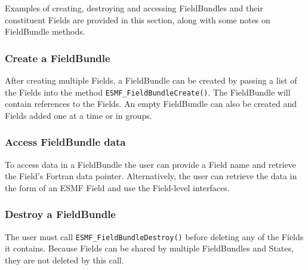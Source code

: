 

Examples of creating, destroying and accessing FieldBundles and their
constituent Fields are provided in this section, along with some
notes on FieldBundle methods.

\subsubsection{Create a FieldBundle}

After creating multiple Fields, a FieldBundle
can be created by passing a list of the Fields into the 
method {\tt ESMF\_FieldBundleCreate()}.  The FieldBundle will contain
references to the Fields.  An empty FieldBundle can also be created
and Fields added one at a time or in groups.

\subsubsection{Access FieldBundle data}

To access data in a FieldBundle the user can provide a Field
name and retrieve the Field's Fortran data pointer.  Alternatively,
the user can retrieve the data in the form of an ESMF 
Field and use the Field-level interfaces.

\subsubsection{Destroy a FieldBundle}

The user must call {\tt ESMF\_FieldBundleDestroy()} before 
deleting any of the Fields it contains.  Because Fields
can be shared by multiple FieldBundles and States, they are
not deleted by this call.


